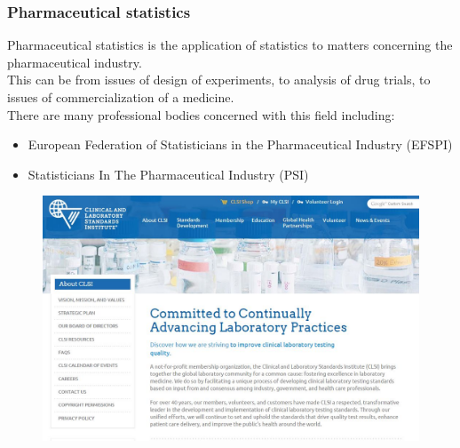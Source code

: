 \documentclass[compress]{beamer}        %
\begin{document}
		
		\begin{frame}
			\frametitle{Pharmaceutical statistics}
			\large
			Pharmaceutical statistics is the application of statistics to matters concerning the pharmaceutical industry. \\ \bigskip
			This can be from issues of design of experiments, to analysis of drug trials, to issues of commercialization of a medicine.\\ \bigskip
			There are many professional bodies concerned with this field including:
			\begin{itemize} 
				\item European Federation of Statisticians in the Pharmaceutical Industry (EFSPI)
				\item Statisticians In The Pharmaceutical Industry (PSI)
			\end{itemize}
		\end{frame}
\begin{frame}
	\begin{figure}
\centering
\includegraphics[width=1.1\linewidth]{images/CLSIWebsite}
\end{figure}

\end{frame}		
\end{document}
